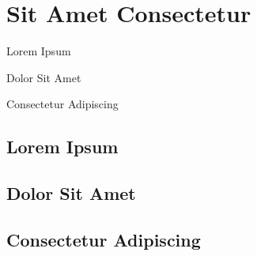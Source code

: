 \subjudul{\lipsum[11][1]}
\chapter{Sit Amet Consectetur}

\begin{dibabini}
  \item Lorem Ipsum
  \item Dolor Sit Amet
  \item Consectetur Adipiscing
\end{dibabini}

\section{Lorem Ipsum}
\lipsum[12-13]

\section{Dolor Sit Amet}
\lipsum[14] \cite{chin2000learning}

\begin{contoh}
\lipsum[15][1-3]
\end{contoh}

\section{Consectetur Adipiscing}
\lipsum[16-17] \cite{barto1995learning}
